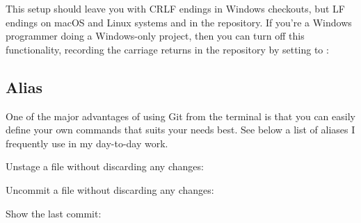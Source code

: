 \begin{flushleft}
\end{flushleft}

\begin{flushleft}
	This setup should leave you with CRLF endings in Windows checkouts, but LF endings on macOS and Linux
	systems and in the repository. If you're a Windows programmer doing a Windows-only project, then you
	can turn off this functionality, recording the carriage returns in the repository by setting 
	to :
\end{flushleft}

\begin{flushleft}
\end{flushleft}

\subsection{Alias}

\begin{flushleft}
	One of the major advantages of using Git from the terminal is that you can easily
	define your own commands that suits your needs best. See below a list of aliases
	I frequently use in my day-to-day work.
\end{flushleft}

\begin{flushleft}
	Unstage a file without discarding any changes:
\end{flushleft}

\begin{flushleft}
\end{flushleft}

\begin{flushleft}
	Uncommit a file without discarding any changes:
\end{flushleft}

\begin{flushleft}
\end{flushleft}

\begin{flushleft}
	Show the last commit:
\end{flushleft}

\begin{flushleft}
\end{flushleft}

